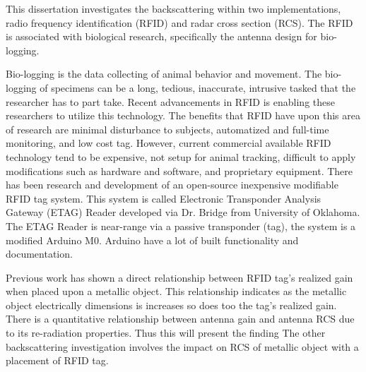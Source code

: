 
This dissertation investigates the backscattering within two implementations, radio frequency identification (RFID) and radar cross section (RCS). The RFID is associated with biological research, specifically the antenna design for bio-logging. 

Bio-logging is the data collecting of animal behavior and movement. The bio-logging of specimens can be a long, tedious, inaccurate, intrusive tasked that the researcher has to part take. Recent advancements in RFID  is enabling these researchers to utilize this technology. The benefits that RFID have upon this area of research are minimal disturbance to subjects, automatized and full-time monitoring, and low cost tag. However, current commercial available RFID technology tend to be expensive, not setup for animal tracking, difficult to apply modifications such as hardware and software, and proprietary equipment. There has been research and development of an open-source inexpensive modifiable RFID tag system. This system is called  Electronic Transponder Analysis Gateway (ETAG) Reader developed via Dr. Bridge from University of Oklahoma. The ETAG Reader is near-range via a passive transponder (tag), the system is a modified Arduino M0. Arduino have a lot of built functionality and documentation.      

 Previous work has shown a direct relationship between RFID tag's realized gain when placed upon a metallic object. This relationship indicates as the metallic object electrically dimensions is increases so does too the tag's realized gain. There is a quantitative relationship between antenna gain and antenna RCS due to its re-radiation properties. \cite{sinclair1947measurement} \cite{king1949measurement}  \cite{appel1979accurate}  Thus this will present the finding The other backscattering investigation involves the impact on RCS of metallic object with a placement of RFID tag.